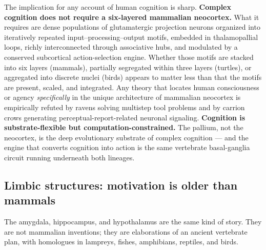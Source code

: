 The implication for any account of human cognition is sharp. \textbf{Complex cognition does not require a six-layered mammalian neocortex.} What it requires are dense populations of glutamatergic projection neurons organized into iteratively repeated input--processing--output motifs, embedded in thalamopallial loops, richly interconnected through associative hubs, and modulated by a conserved subcortical action-selection engine. Whether those motifs are stacked into six layers (mammals), partially segregated within three layers (turtles), or aggregated into discrete nuclei (birds) appears to matter less than that the motifs are present, scaled, and integrated. Any theory that locates human consciousness or agency \emph{specifically} in the unique architecture of mammalian neocortex is empirically refuted by ravens solving multistep tool problems and by carrion crows generating perceptual-report-related neuronal signaling. \textbf{Cognition is substrate-flexible but computation-constrained.} The pallium, not the neocortex, is the deep evolutionary substrate of complex cognition --- and the engine that converts cognition into action is the same vertebrate basal-ganglia circuit running underneath both lineages.

\subsection{Limbic structures: motivation is older than mammals}\label{05_vertebrates-limbic-structures-motivation-is-older-than-mammals}

The amygdala, hippocampus, and hypothalamus are the same kind of story. They are not mammalian inventions; they are elaborations of an ancient vertebrate plan, with homologues in lampreys, fishes, amphibians, reptiles, and birds.

